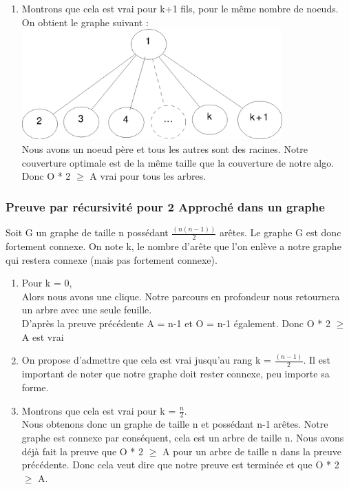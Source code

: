 \begin{enumerate}
\item Montrons que cela est vrai pour k+1 fils, pour le m\^eme nombre de noeuds.\\

On obtient le graphe suivant :\\

\bigskip
\includegraphics[width=10cm]{demo2}\\

\bigskip
Nous avons un noeud p\`ere et tous les autres sont des racines. Notre couverture optimale est de la m\^eme taille que la couverture de notre algo. Donc O  * 2 $\geq$ A vrai pour tous les arbres.

\end{enumerate}

\subsubsection{Preuve par r\'ecursivit\'e pour 2 Approch\'e dans un graphe}

Soit G un graphe de taille n poss\'edant $\frac{(n(n-1))}{2}$ ar\^etes. Le graphe G est donc fortement connexe.
On note k, le nombre d'ar\^ete que l'on enl\`eve a notre graphe qui restera connexe (mais pas fortement connexe).

\bigskip
\begin{enumerate}
 \item Pour k = 0,\\
Alors nous avons une clique. Notre parcours en profondeur nous retournera un arbre avec une seule feuille. \\
D'apr\`es la preuve pr\'ec\'edente A = n-1 et O = n-1 \'egalement. Donc O * 2 $\geq$ A est vrai

\item On propose d'admettre que cela est vrai jusqu'au rang k = $\frac{(n-1)}{2}$. Il est important de noter que notre graphe doit rester connexe, peu importe sa forme.

\item Montrons que cela est vrai pour k = $\frac{n}{2}$.\\
Nous obtenons donc un graphe de taille n et poss\'edant n-1 ar\^etes. Notre graphe est connexe par cons\'equent, cela est un arbre de taille n. Nous avons d\'ej\`a fait la preuve que O * 2 $\geq$ A pour un arbre de taille n dans la preuve pr\'ec\'edente. Donc cela veut dire que notre preuve est termin\'ee et que O * 2 $\geq$ A.

\end{enumerate}
